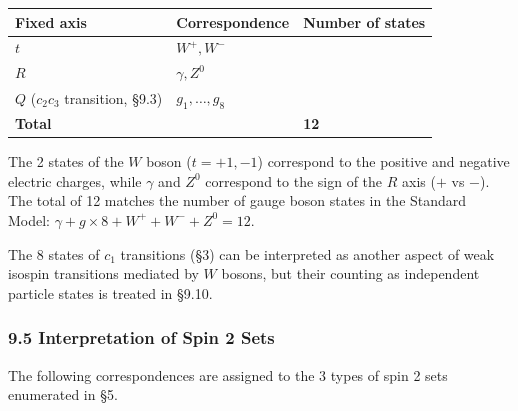\documentclass[
  a4paper,11pt]{article}
\newcounter{none}
\theoremstyle{definition}
\theoremstyle{remark}
\begin{document}
{\def\LTcaptype{none} %
\begin{longtable}[]{@{}
  >{\raggedright\arraybackslash}p{}
  >{\raggedright\arraybackslash}p{}
  >{\centering\arraybackslash}p{}@{}}
\toprule\noalign{}
\begin{minipage}[b]{\linewidth}\raggedright
Fixed axis
\end{minipage} & \begin{minipage}[b]{\linewidth}\raggedright
Correspondence
\end{minipage} & \begin{minipage}[b]{\linewidth}\centering
Number of states
\end{minipage} \\
\midrule\noalign{}
\endhead
\bottomrule\noalign{}
\endlastfoot
\(t\) & \(W^+, W^-\) & 2 \\
\(R\) & \(\gamma, Z^0\) & 2 \\
\(Q\) (\(c_2 c_3\) transition, §9.3) & \(g_1, \ldots, g_8\) & 8 \\
\textbf{Total} & & \textbf{12} \\
\end{longtable}
}

The 2 states of the \(W\) boson (\(t = +1, -1\)) correspond to the
positive and negative electric charges, while \(\gamma\) and \(Z^0\)
correspond to the sign of the \(R\) axis (\(+\) vs \(-\)). The total of
12 matches the number of gauge boson states in the Standard Model:
\(\gamma + g \times 8 + W^+ + W^- + Z^0 = 12\).

The 8 states of \(c_1\) transitions (§3) can be interpreted as another
aspect of weak isospin transitions mediated by \(W\) bosons, but their
counting as independent particle states is treated in §9.10.

\subsubsection{9.5 Interpretation of Spin 2
Sets}\label{interpretation-of-spin-2-sets}

The following correspondences are assigned to the 3 types of spin 2 sets
enumerated in §5.
\end{document}
